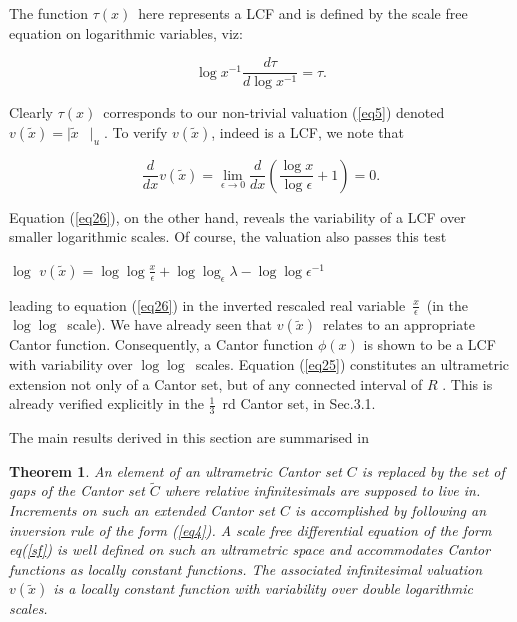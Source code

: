 \documentclass[12pt]{article}
\newtheorem{theorem}{Theorem}
\begin{document}
\noindent The function $\tau (x)$\ here represents a LCF and is
defined by the scale free equation on logarithmic variables, viz:

\bigskip 
\begin{equation}\label{eq26}
\log x^{-1}\frac{d\tau }{d\log x^{-1}}=\tau.
\end{equation}

\noindent Clearly $\tau (x)$\ corresponds to our non-trivial valuation (\ref{eq5}) denoted $v(\tilde{x})=\mid \tilde{x}$\ $\mid _{u}$. To verify $v(\tilde x)$, indeed is a LCF, we note that

\begin{equation}\label{eq27}
\frac{d}{dx}v(\tilde{x})=\underset{\epsilon \rightarrow 0}{\lim }\frac{d}{dx}%
\left( \frac{\log x}{\log \epsilon }+1\right) =0.
\end{equation}

\noindent Equation (\ref{eq26}), on the other hand, reveals the variability of a LCF over smaller logarithmic scales. Of course, the valuation
also passes this test \bigskip
\begin{center}
$\log $ $v(\tilde{x})=\log \log \frac{x}{\epsilon }+\log \log _{\epsilon
}\lambda -\log \log \epsilon ^{-1}$
\end{center}
\bigskip 
\noindent leading to equation (\ref{eq26}) in the inverted rescaled real variable\ $%
\frac{x}{\epsilon }$\ (in the $\log \log $\ scale). We have already seen
that $v(\tilde{x})$\ relates to an appropriate Cantor function.
Consequently, a Cantor function $\phi (x)$ is shown to be a LCF with variability over $\log \log $\ scales. Equation (\ref{eq25})
constitutes an ultrametric extension not only of a Cantor set, but of any
connected interval of $R$ \cite{ad}. This is already verified explicitly in the $\frac{
1}{3}$\ rd Cantor set, in Sec.3.1.   

\vspace{.25cm}

The main results derived in this section are summarised in 

\begin{theorem}
An element of an ultrametric  Cantor set $C$ is replaced by the set of gaps of the Cantor set $\tilde C$ where relative infinitesimals are supposed to live in. Increments on such an extended Cantor set $C$ is accomplished by following an inversion rule of the form (\ref{eq4}). A scale free differential equation of the form eq(\ref{sf}) is well defined on such an ultrametric space and accommodates Cantor functions as locally constant functions.
The associated infinitesimal valuation $v(\tilde x)$ is a locally constant function with variability over double logarithmic scales.
\end{theorem}
\end{document}

